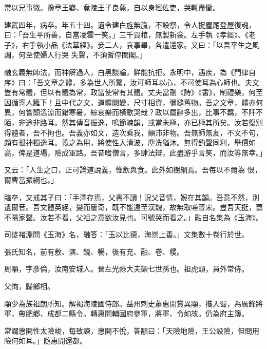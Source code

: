 \begin{pinyinscope}
 常以兄事微。豫章王嶷、竟陵王子良薨，自以身經佐吏，哭輒盡慟。



 建武四年，病卒。年五十四。遺令建白旌無旒，不設祭，令人捉麈尾登屋復魂，曰：「吾生平所善，自當凌雲一笑。」三千買棺，無製新衾。左手執《孝經》、《老子》，右手執小品《法華經》。妾二人，哀事畢，各遣還家。又曰：「以吾平生之風調，何至使婦人行哭
 失聲，不須暫停閨閣。」



 融玄義無師法，而神解過人，白黑談論，鮮能抗拒。永明中，遇疾，為《門律自序》曰：「吾文章之體，多為世人所驚，汝可師耳以心，不可使耳為心師也。夫文豈有常體，但以有體為常，政當使常有其體。丈夫當刪《詩》《書》，制禮樂，何至因循寄人籬下！且中代之文，道體闕變，尺寸相資，彌縫舊物。吾之文章，體亦何異，何嘗顛溫涼而錯寒暑，綜哀樂而橫歌哭哉？政以屬辭多出，比事不羈，不阡不陌，非途非路耳。然其傳音振逸，鳴節竦韻，或當未極，亦已極其所矣。汝若復別得體者，吾不拘也。吾義亦如文，造次乘我，顛沛非物。吾無師無友，不文不句，頗有孤神獨逸耳。義之為用，將使性入清波，塵洗猶沐。無得釣聲同利，舉價如高，俾是道場，險成軍路。吾昔嗜僧言，多肆法辯，此盡游乎言笑，而汝等無幸。」



 又云：「人生之口，正可論道說義，惟飲與食。此外如樹網焉。吾每以不爾為
 恨，爾曹當振綱也。」



 臨卒，又戒其子曰：「手澤存焉，父書不讀！況父音情，婉在其韻。吾意不然，別遺爾音。吾文體英絕，變而屢奇，既不能遠至漢魏，故無取嗟晉宋。豈吾天挺，蓋不隤家聲。汝若不看，父祖之意欲汝見也。可號哭而看之。」融自名集為《玉海》。



 司徒褚淵問《玉海》名，融答：「玉以比德，海崇上善。」文集數十卷行於世。



 張氏知名，前有敷、演、鏡、暢，後有充、融、卷、稷。



 周顒，字彥倫，汝南安城人。晉左光祿大夫顗七世孫也。祖虎頭，員外常侍。



 父恂，歸鄉相。



 顒少為族祖朗所知。解褐海陵國侍郎。益州刺史蕭惠開賞異顒，攜入蜀，為厲鋒將軍，帶肥鄉、成都二縣令。轉惠開輔國府參軍，將軍、令如故。仍為府主簿。



 常謂惠開性太險峻，每致諫，惠開不悅，答顒曰：「天險地險，王公設險，但問用險何如耳。」隨惠開還都。




\end{pinyinscope}
